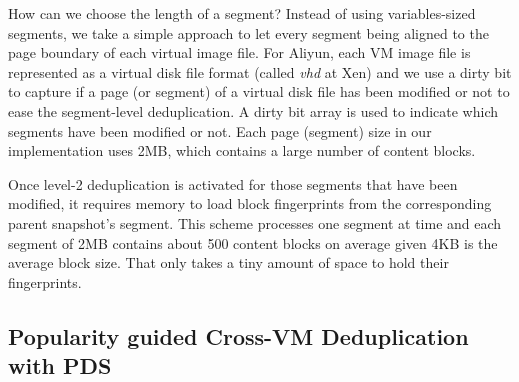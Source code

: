 How can we choose the length of a segment?
Instead of using variables-sized segments, we take a simple approach
to let every segment being aligned to the page boundary of each virtual image file.
For Aliyun, each VM image file is represented as a virtual disk file format
(called \emph{vhd} at Xen) and we use a dirty bit to capture if a page (or segment) of a virtual disk file 
has been modified or not to ease the segment-level deduplication.
A dirty bit array is used to indicate which segments have been modified or not. 
Each page (segment) size in our implementation uses 2MB, which contains a large number of content blocks.



Once level-2 deduplication is activated for those segments that have been modified,
it requires memory to load  block fingerprints from the corresponding
parent snapshot's segment.
This scheme processes one segment at time and each segment of 2MB contains about 
500 content blocks on average given 4KB is the average block size.
That only takes a tiny amount of space to hold their fingerprints.

\subsection{Popularity guided Cross-VM Deduplication with PDS}
\label{sect:crossVM}

